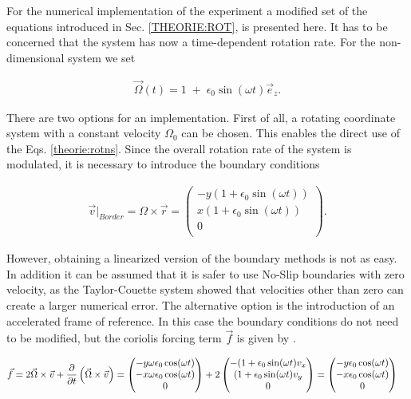 For the numerical implementation of the experiment a modified set of the equations
introduced in Sec. \ref{THEORIE:ROT}, is presented here.
It has to be concerned that the system has now a time-dependent rotation rate.
For the non-dimensional system we set

\begin{align}
    \vec{\Omega}(t) = 1 \; + \; \epsilon_0 \sin(\omega t)\vec{e}_z.
\end{align}

There are two options for an implementation.
First of all, a rotating coordinate system with a constant velocity $\Omega_0$ can be chosen.
This enables the direct use of the Eqs. \ref{theorie:rotns}. Since the overall rotation rate of the system is
modulated, it is necessary to introduce the boundary conditions

\begin{align}
    \vec{v}|_{Border}  = \Omega \times \vec{r} = \begin{pmatrix}
           -y ( 1 + \epsilon_0 \sin(\omega t)) \\
            x ( 1 + \epsilon_0 \sin(\omega t)) \\
           0\\
         \end{pmatrix}.
\end{align}

However, obtaining a linearized version of the boundary methods is not as easy.
In addition it can be assumed that it is safer to use No-Slip boundaries with zero velocity, as
the Taylor-Couette system showed that velocities other than zero can create a larger numerical error.
The alternative option is the introduction of an accelerated frame of reference.
In this case the boundary conditions do not need to be modified, but the coriolis forcing term $\vec{f}$ is given by \citep{Tilgner2007}.

\begin{align}
    \vec{f} &= 2 \vec{\Omega} \times \vec{v} + \pdn[]{t}\left(\vec{\Omega} \times \vec{v} \right)
            = \begin{pmatrix}
           -y \omega \epsilon_0 \cos(\omega t) \\
           -x \omega \epsilon_0 \cos(\omega t) \\
           0\\
         \end{pmatrix}
            + 2\begin{pmatrix}
           - ( 1 + \epsilon_0 \sin(\omega t)v_x \\
             ( 1 + \epsilon_0 \sin(\omega t)v_y \\
           0\\
         \end{pmatrix}
            = \begin{pmatrix}
           -y \epsilon_0 \cos(\omega t) \\
           -x \epsilon_0 \cos(\omega t) \\
           0\\
         \end{pmatrix}
\end{align}

